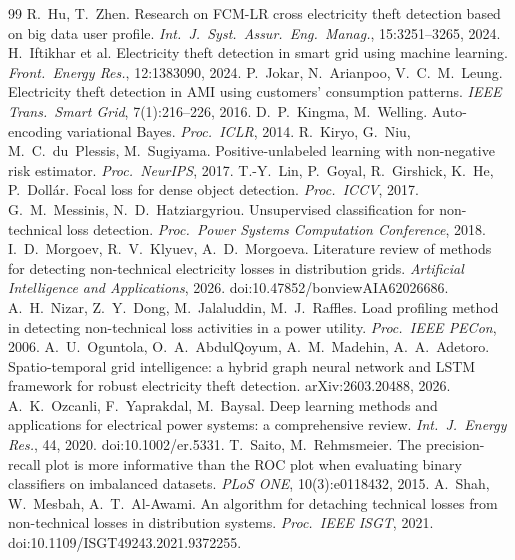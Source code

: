 \documentclass[11pt,a4paper]{article}
\theoremstyle{plain}
\theoremstyle{definition}
\theoremstyle{remark}
\begin{document}
\begin{thebibliography}{99}
 R.~Hu, T.~Zhen. Research on FCM-LR cross electricity theft detection based on big data user profile. \emph{Int.\ J.\ Syst.\ Assur.\ Eng.\ Manag.}, 15:3251--3265, 2024.
 H.~Iftikhar et al. Electricity theft detection in smart grid using machine learning. \emph{Front.\ Energy Res.}, 12:1383090, 2024.
 P.~Jokar, N.~Arianpoo, V.~C.~M.~Leung. Electricity theft detection in AMI using customers' consumption patterns. \emph{IEEE Trans.\ Smart Grid}, 7(1):216--226, 2016.
 D.~P.~Kingma, M.~Welling. Auto-encoding variational Bayes. \emph{Proc.\ ICLR}, 2014.
 R.~Kiryo, G.~Niu, M.~C.~du~Plessis, M.~Sugiyama. Positive-unlabeled learning with non-negative risk estimator. \emph{Proc.\ NeurIPS}, 2017.
 T.-Y.~Lin, P.~Goyal, R.~Girshick, K.~He, P.~Doll\'ar. Focal loss for dense object detection. \emph{Proc.\ ICCV}, 2017.
 G.~M.~Messinis, N.~D.~Hatziargyriou. Unsupervised classification for non-technical loss detection. \emph{Proc.\ Power Systems Computation Conference}, 2018.
 I.~D.~Morgoev, R.~V.~Klyuev, A.~D.~Morgoeva. Literature review of methods for detecting non-technical electricity losses in distribution grids. \emph{Artificial Intelligence and Applications}, 2026. doi:10.47852/bonviewAIA62026686.
 A.~H.~Nizar, Z.~Y.~Dong, M.~Jalaluddin, M.~J.~Raffles. Load profiling method in detecting non-technical loss activities in a power utility. \emph{Proc.\ IEEE PECon}, 2006.
 A.~U.~Oguntola, O.~A.~AbdulQoyum, A.~M.~Madehin, A.~A.~Adetoro. Spatio-temporal grid intelligence: a hybrid graph neural network and LSTM framework for robust electricity theft detection. arXiv:2603.20488, 2026.
 A.~K.~Ozcanli, F.~Yaprakdal, M.~Baysal. Deep learning methods and applications for electrical power systems: a comprehensive review. \emph{Int.\ J.\ Energy Res.}, 44, 2020. doi:10.1002/er.5331.
 T.~Saito, M.~Rehmsmeier. The precision-recall plot is more informative than the ROC plot when evaluating binary classifiers on imbalanced datasets. \emph{PLoS ONE}, 10(3):e0118432, 2015.
 A.~Shah, W.~Mesbah, A.~T.~Al-Awami. An algorithm for detaching technical losses from non-technical losses in distribution systems. \emph{Proc.\ IEEE ISGT}, 2021. doi:10.1109/ISGT49243.2021.9372255.

\end{thebibliography}
\end{document}
